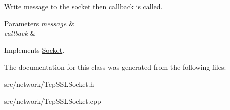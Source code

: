 Write message to the socket then callback is called. 


\begin{DoxyParams}{Parameters}
{\em message} & \\
\hline
{\em callback} & \\
\hline
\end{DoxyParams}


Implements \hyperlink{class_socket_a26aaf8ea1c9436d7d315aa58ad1c3f3b}{Socket}.



The documentation for this class was generated from the following files\-:\begin{DoxyCompactItemize}
\item 
src/network/Tcp\-S\-S\-L\-Socket.\-h\item 
src/network/Tcp\-S\-S\-L\-Socket.\-cpp\end{DoxyCompactItemize}
